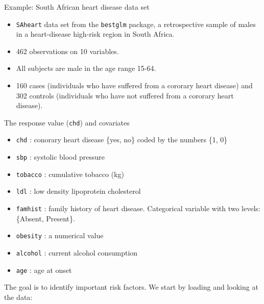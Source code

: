 \documentclass[
  10pt,
  ignorenonframetext,
]{beamer}
\providecommand{\tightlist}{%
  \setlength{\itemsep}{0pt}\setlength{\parskip}{0pt}}
\begin{document}
\begin{frame}[fragile]
\begin{block}{Example: South African heart disease data set}
\protect\hypertarget{example-south-african-heart-disease-data-set}{}
\(~\)

\begin{itemize}
\tightlist
\item
  \texttt{SAheart} data set from the \texttt{bestglm} package, a
  retrospective sample of males in a heart-disease high-risk region in
  South Africa.
\end{itemize}

\vspace{2mm}

\begin{itemize}
\tightlist
\item
  462 observations on 10 variables.
\end{itemize}

\vspace{2mm}

\begin{itemize}
\tightlist
\item
  All subjects are male in the age range 15-64.
\end{itemize}

\vspace{2mm}

\begin{itemize}
\tightlist
\item
  160 cases (individuals who have suffered from a cororary heart
  disease) and 302 controls (individuals who have not suffered from a
  cororary heart disease).
\end{itemize}
\end{block}
\end{frame}

\begin{frame}[fragile]
The response value (\texttt{chd}) and covariates

\begin{itemize}
\tightlist
\item
  \texttt{chd} : conorary heart disease \{yes, no\} coded by the numbers
  \{1, 0\}
\item
  \texttt{sbp} : systolic blood pressure\\
\item
  \texttt{tobacco} : cumulative tobacco (kg)\\
\item
  \texttt{ldl} : low density lipoprotein cholesterol
\item
  \texttt{famhist} : family history of heart disease. Categorical
  variable with two levels: \{Absent, Present\}.
\item
  \texttt{obesity} : a numerical value
\item
  \texttt{alcohol} : current alcohol consumption
\item
  \texttt{age} : age at onset
\end{itemize}

The goal is to identify important risk factors. We start by loading and
looking at the data:
\end{frame}
\end{document}
